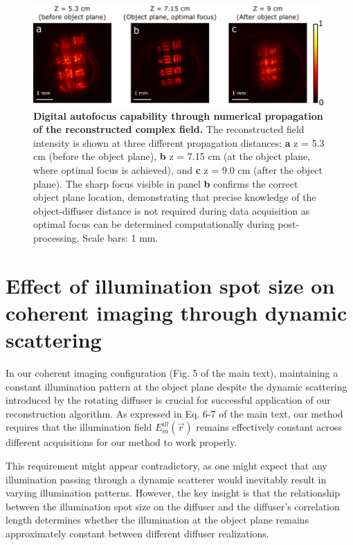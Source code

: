 \documentclass[pdflatex,sn-mathphys-num,Numbered]{sn-jnl}%
\theoremstyle{thmstyleone}%
\theoremstyle{thmstyletwo}%
\theoremstyle{thmstylethree}%
\begin{document}
    \begin{figure}[hb]
        \centering
        \includegraphics[width=0.99\textwidth]{supp_figures/figure_S6.pdf}
        \caption{\textbf{Digital autofocus capability through numerical propagation of the reconstructed complex field.} The reconstructed field intensity is shown at three different propagation distances: \textbf{a} z = 5.3 cm (before the object plane), \textbf{b} z = 7.15 cm (at the object plane, where optimal focus is achieved), and \textbf{c} z = 9.0 cm (after the object plane). The sharp focus visible in panel \textbf{b} confirms the correct object plane location, demonstrating that precise knowledge of the object-diffuser distance is not required during data acquisition as optimal focus can be determined computationally during post-processing. Scale bars: 1 mm.}
            \label{fig:autofocus}

    \end{figure}

           

\newpage

\section*{Effect of illumination spot size on coherent imaging through dynamic scattering}

In our coherent imaging configuration (Fig. 5 of the main text), maintaining a constant illumination pattern at the object plane despite the dynamic scattering introduced by the rotating diffuser is crucial for successful application of our reconstruction algorithm. As expressed in Eq. 6-7 of the main text, our method requires that the illumination field $E_m^{ill}(\vec{r})$ remains effectively constant across different acquisitions for our method to work properly.

This requirement might appear contradictory, as one might expect that any illumination passing through a dynamic scatterer would inevitably result in varying illumination patterns. However, the key insight is that the relationship between the illumination spot size on the diffuser and the diffuser's correlation length determines whether the illumination at the object plane remains approximately constant between different diffuser realizations.
\end{document}
